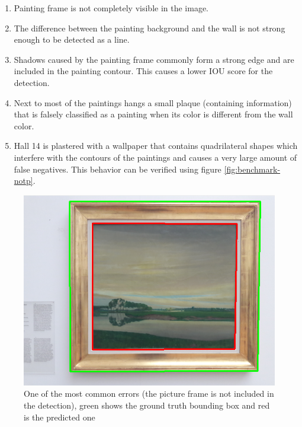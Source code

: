 \begin{enumerate}
    \item Painting frame is not completely visible in the image.
    \item The difference between the painting background and the wall is not strong enough to be detected as a line.
    \item Shadows caused by the painting frame commonly form a strong edge and are included in the painting contour. This causes a lower IOU score for the detection.
    \item Next to most of the paintings hangs a small plaque (containing information) that is falsely classified as a painting when its color is different from the wall color.
    \item Hall 14 is plastered with a wallpaper that contains quadrilateral shapes which interfere with the contours of the paintings and causes a very large amount of false negatives. This behavior can be verified using figure \ref{fig:benchmark-notp}.
\end{enumerate}

\begin{figure}[htbp]
    \includegraphics[width=\linewidth]{images/common-error-noframe.png}
    \caption{One of the most common errors (the picture frame is not included in the detection), green shows the ground truth bounding box and red is the predicted one}
    \label{fig:common-error-noframe}
\end{figure}